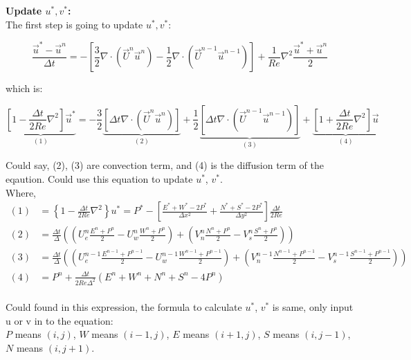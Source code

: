 \documentclass[12pt]{article}
\begin{document}
\textbf{Update $u^*, v^*$:}\\


The first step is going to update $u^*, v^*$:


\begin{equation}
    \frac{\vec{u}^{*} - \vec{u}^{n}}{\Delta t} = -[\frac{3}{2} \nabla \cdot (\vec{U}^n \vec{u}^{n}) - \frac{1}{2} \nabla \cdot (\vec{U}^{n-1} \vec{u}^{n-1}) ] + \frac{1}{Re} \nabla^{2} \frac{\vec{u}^*+\vec{u}^{n}}{2}
\end{equation}
    
which is:


    \begin{equation}
    \underbrace{[1 - \frac{\Delta t}{2Re}\nabla^2]\vec{u}^{*}}_{(1)} 
    = 
    -\frac{3}{2} \underbrace{[\Delta t \nabla \cdot (\vec{U}^n \vec{u}^{n})]}_{(2)} 
    + \frac{1}{2} \underbrace{[\Delta t  \nabla \cdot (\vec{U}^{n-1} \vec{u}^{n-1})]}_{(3)} 
    +\underbrace{[1+ \frac{\Delta t}{2Re} \nabla^{2}] \vec{u}}_{(4)}
\end{equation}

Could say, (2), (3) are convection term, and (4) is the diffusion term of the eqaution. 
Could use this equation to update $u^*$, $v^*$.\\


Where,
\begin{align*}
    (1) &= \left\{ 1 - \frac{\Delta t}{2Re} \nabla^2 \right\} u^{*} = P^{*} - \left[\frac{E^{*} + W^{*} - 2P^*}{\Delta x^{2}} + \frac{N^{*} + S^{*} - 2P^*}{\Delta y^{2}}\right] \frac{\Delta t}{2Re} \\
    (2) &= \frac{\Delta t}{\Delta} \left((U_{e}^{n} \frac{ E^{n} + P^{n}}{2} - U_{w}^{n} \frac{ W^{n} + P^{n}}{2}) + (V_{n}^{n} \frac{ N^{n} + P^{n}}{2} - V_{s}^{n} \frac{ S^{n} + P^{n}}{2}) \right) \\
    (3) &= \frac{\Delta t}{\Delta} \left((U_{e}^{n-1} \frac{ E^{n-1} + P^{n-1}}{2} - U_{w}^{n-1} \frac{ W^{n-1} + P^{n-1}}{2}) + (V_{n}^{n-1} \frac{ N^{n-1} + P^{n-1}}{2} - V_{s}^{n-1} \frac{ S^{n-1} + P^{n-1}}{2}) \right) \\
    (4) &= P^n + \frac{\Delta t}{2 Re \Delta^2} \left( E^{n} + W^{n} + N^{n} + S^{n} - 4P^{n} \right)
\end{align*}\\


    Could found in this expression, the formula to calculate $u^*$, $v^*$ is same, only input u or v in to the equation:\\

    $P$ means $(i,j)$, $W$ means $(i-1,j)$, $E$ means $(i+1,j)$, $S$ means $(i,j-1)$, $N$ means $(i,j+1)$.\\
\end{document}
